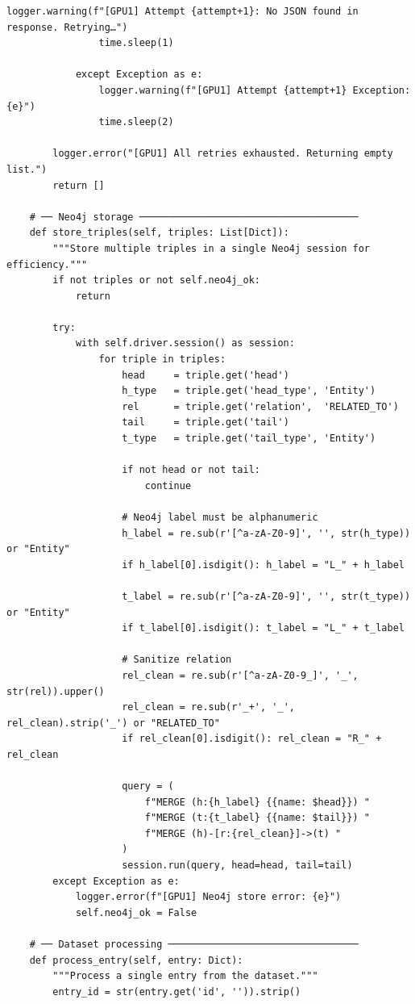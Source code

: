 \documentclass[11pt]{article}
\begin{document}
\begin{lstlisting}[style=pythoncode, caption={kg\_generator\_gpu\_1.py}]
                logger.warning(f"[GPU1] Attempt {attempt+1}: No JSON found in response. Retrying…")
                time.sleep(1)

            except Exception as e:
                logger.warning(f"[GPU1] Attempt {attempt+1} Exception: {e}")
                time.sleep(2)

        logger.error("[GPU1] All retries exhausted. Returning empty list.")
        return []

    # ── Neo4j storage ──────────────────────────────────────
    def store_triples(self, triples: List[Dict]):
        """Store multiple triples in a single Neo4j session for efficiency."""
        if not triples or not self.neo4j_ok:
            return
            
        try:
            with self.driver.session() as session:
                for triple in triples:
                    head     = triple.get('head')
                    h_type   = triple.get('head_type', 'Entity')
                    rel      = triple.get('relation',  'RELATED_TO')
                    tail     = triple.get('tail')
                    t_type   = triple.get('tail_type', 'Entity')

                    if not head or not tail:
                        continue

                    # Neo4j label must be alphanumeric
                    h_label = re.sub(r'[^a-zA-Z0-9]', '', str(h_type)) or "Entity"
                    if h_label[0].isdigit(): h_label = "L_" + h_label

                    t_label = re.sub(r'[^a-zA-Z0-9]', '', str(t_type)) or "Entity"
                    if t_label[0].isdigit(): t_label = "L_" + t_label

                    # Sanitize relation
                    rel_clean = re.sub(r'[^a-zA-Z0-9_]', '_', str(rel)).upper()
                    rel_clean = re.sub(r'_+', '_', rel_clean).strip('_') or "RELATED_TO"
                    if rel_clean[0].isdigit(): rel_clean = "R_" + rel_clean

                    query = (
                        f"MERGE (h:{h_label} {{name: $head}}) "
                        f"MERGE (t:{t_label} {{name: $tail}}) "
                        f"MERGE (h)-[r:{rel_clean}]->(t) "
                    )
                    session.run(query, head=head, tail=tail)
        except Exception as e:
            logger.error(f"[GPU1] Neo4j store error: {e}")
            self.neo4j_ok = False

    # ── Dataset processing ─────────────────────────────────
    def process_entry(self, entry: Dict):
        """Process a single entry from the dataset."""
        entry_id = str(entry.get('id', '')).strip()
        

\end{lstlisting}
\end{document}
